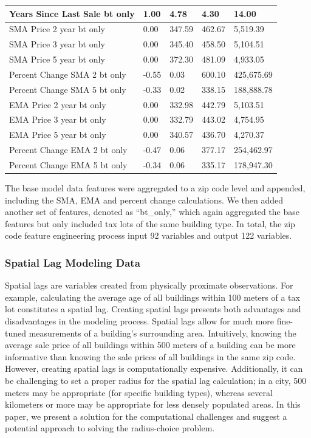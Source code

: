 \documentclass[conference,final,]{IEEEtran}
\begin{document}
\begin{table}
\begin{tabular}[t]{l|l|l|l|l}
\hline
Years Since Last Sale bt only & 1.00 & 4.78 & 4.30 & 14.00\\
\hline
SMA Price 2 year bt only & 0.00 & 347.59 & 462.67 & 5,519.39\\
\hline
SMA Price 3 year bt only & 0.00 & 345.40 & 458.50 & 5,104.51\\
\hline
SMA Price 5 year bt only & 0.00 & 372.30 & 481.09 & 4,933.05\\
\hline
Percent Change SMA 2 bt only & -0.55 & 0.03 & 600.10 & 425,675.69\\
\hline
Percent Change SMA 5 bt only & -0.33 & 0.02 & 338.15 & 188,888.78\\
\hline
EMA Price 2 year bt only & 0.00 & 332.98 & 442.79 & 5,103.51\\
\hline
EMA Price 3 year bt only & 0.00 & 332.79 & 443.02 & 4,754.95\\
\hline
EMA Price 5 year bt only & 0.00 & 340.57 & 436.70 & 4,270.37\\
\hline
Percent Change EMA 2 bt only & -0.47 & 0.06 & 377.17 & 254,462.97\\
\hline
Percent Change EMA 5 bt only & -0.34 & 0.06 & 335.17 & 178,947.30\\
\hline
\end{tabular}
\end{table}

The base model data features were aggregated to a zip code level and
appended, including the SMA, EMA and percent change calculations. We
then added another set of features, denoted as ``bt\_only,'' which again
aggregated the base features but only included tax lots of the same
building type. In total, the zip code feature engineering process input
92 variables and output 122 variables.

\hypertarget{spatial-lag-modeling-data}{%
\subsubsection{Spatial Lag Modeling
Data}\label{spatial-lag-modeling-data}}

Spatial lags are variables created from physically proximate
observations. For example, calculating the average age of all buildings
within 100 meters of a tax lot constitutes a spatial lag. Creating
spatial lags presents both advantages and disadvantages in the modeling
process. Spatial lags allow for much more fine-tuned measurements of a
building's surrounding area. Intuitively, knowing the average sale price
of all buildings within 500 meters of a building can be more informative
than knowing the sale prices of all buildings in the same zip code.
However, creating spatial lags is computationally expensive.
Additionally, it can be challenging to set a proper radius for the
spatial lag calculation; in a city, 500 meters may be appropriate (for
specific building types), whereas several kilometers or more may be
appropriate for less densely populated areas. In this paper, we present
a solution for the computational challenges and suggest a potential
approach to solving the radius-choice problem.
\end{document}

